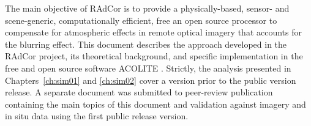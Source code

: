The main objective of RAdCor is to provide a physically-based, sensor- and scene-generic, computationally efficient, free an open source processor to compensate for atmospheric effects in remote optical imagery that accounts for the blurring effect. This document describes the approach developed in the RAdCor project, its theoretical background, and specific implementation in the free and open source software ACOLITE \citep[][\url{https://odnature.naturalsciences.be/remsem/software-and-data/acolite}]{Vanhellemont2018,Vanhellemont2019a,Vanhellemont2019b}. Strictly, the analysis presented in Chapters~\ref{ch:sim01} and \ref{ch:sim02} cover a version prior to the public version release. A separate document was submitted to peer-review publication containing the main topics of this document and validation against imagery and in situ data \citep{Castagna2024} using the first public release version.

